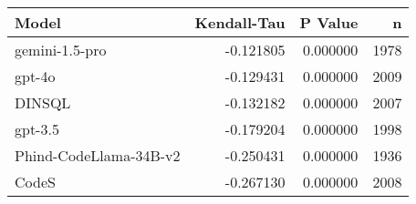 \begin{tabular}{lrrr}
\toprule
Model & Kendall-Tau & P Value & n \\
\midrule
gemini-1.5-pro & -0.121805 & 0.000000 & 1978 \\
gpt-4o & -0.129431 & 0.000000 & 2009 \\
DINSQL & -0.132182 & 0.000000 & 2007 \\
gpt-3.5 & -0.179204 & 0.000000 & 1998 \\
Phind-CodeLlama-34B-v2 & -0.250431 & 0.000000 & 1936 \\
CodeS & -0.267130 & 0.000000 & 2008 \\
\bottomrule
\end{tabular}
